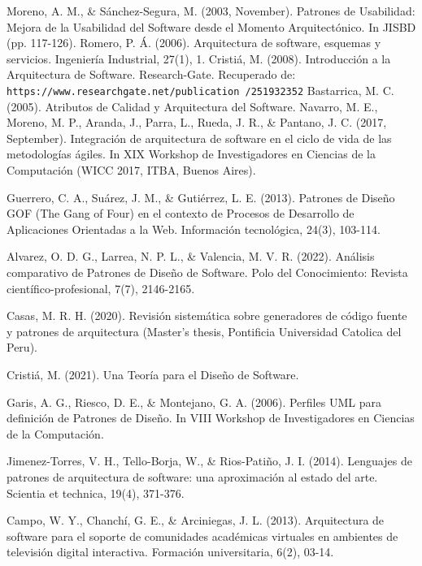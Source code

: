 \documentclass[twocolumn]{article}
\begin{document}

\begin{thebibliography}{99}
 Moreno, A. M., \& Sánchez-Segura, M. (2003, November). Patrones de Usabilidad: Mejora de la Usabilidad del Software desde el Momento Arquitectónico. In JISBD (pp. 117-126).
 Romero, P. Á. (2006). Arquitectura de software, esquemas y servicios. Ingeniería Industrial, 27(1), 1.
 Cristiá, M. (2008). Introducción a la Arquitectura de Software. Research-Gate. Recuperado de: \texttt{https://www.researchgate.net/publication
/251932352}
 Bastarrica, M. C. (2005). Atributos de Calidad y Arquitectura del Software.
 Navarro, M. E., Moreno, M. P., Aranda, J., Parra, L., Rueda, J. R., \& Pantano, J. C. (2017, September). Integración de arquitectura de software en el ciclo de vida de las metodologías ágiles. In XIX Workshop de Investigadores en Ciencias de la Computación (WICC 2017, ITBA, Buenos Aires).

 Guerrero, C. A., Suárez, J. M., \& Gutiérrez, L. E. (2013). Patrones de Diseño GOF (The Gang of Four) en el contexto de Procesos de Desarrollo de Aplicaciones Orientadas a la Web. Información tecnológica, 24(3), 103-114.

 Alvarez, O. D. G., Larrea, N. P. L., \& Valencia, M. V. R. (2022). Análisis comparativo de Patrones de Diseño de Software. Polo del Conocimiento: Revista científico-profesional, 7(7), 2146-2165.

 Casas, M. R. H. (2020). Revisión sistemática sobre generadores de código fuente y patrones de arquitectura (Master's thesis, Pontificia Universidad Catolica del Peru).

 Cristiá, M. (2021). Una Teoría para el Diseño de Software.

 Garis, A. G., Riesco, D. E., \& Montejano, G. A. (2006). Perfiles UML para definición de Patrones de Diseño. In VIII Workshop de Investigadores en Ciencias de la Computación.

 Jimenez-Torres, V. H., Tello-Borja, W., \& Rios-Patiño, J. I. (2014). Lenguajes de patrones de arquitectura de software: una aproximación al estado del arte. Scientia et technica, 19(4), 371-376.

 Campo, W. Y., Chanchí, G. E., \& Arciniegas, J. L. (2013). Arquitectura de software para el soporte de comunidades académicas virtuales en ambientes de televisión digital interactiva. Formación universitaria, 6(2), 03-14.


\end{thebibliography}
\end{document}
